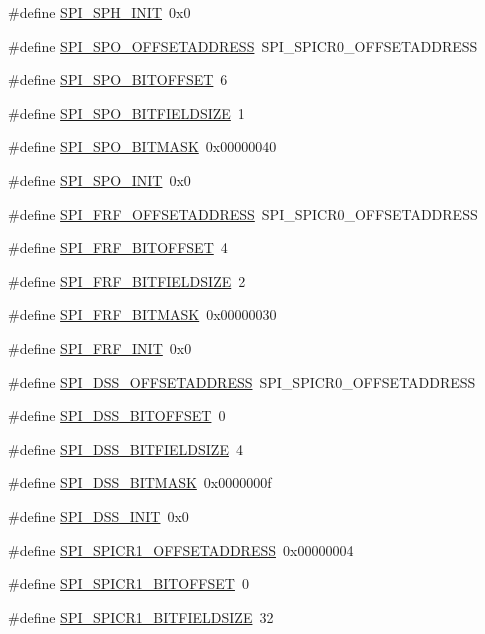 \begin{DoxyCompactItemize}
\#define \hyperlink{a00573_a8829e8547ceb20ef14e7c8264985f681}{SPI\_\-SPH\_\-INIT}~0x0
\item 
\#define \hyperlink{a00573_a82072330df5e7554bc2aa751a36dbbef}{SPI\_\-SPO\_\-OFFSETADDRESS}~SPI\_\-SPICR0\_\-OFFSETADDRESS
\item 
\#define \hyperlink{a00573_afad8700e3398535ed93efcd17d5f81d0}{SPI\_\-SPO\_\-BITOFFSET}~6
\item 
\#define \hyperlink{a00573_a732f4956a82bd56d8f26559dcef2acff}{SPI\_\-SPO\_\-BITFIELDSIZE}~1
\item 
\#define \hyperlink{a00573_a22d30b2da982bb491cee8354bc7ac302}{SPI\_\-SPO\_\-BITMASK}~0x00000040
\item 
\#define \hyperlink{a00573_ad2263aff8d70935c03305fd06c6724b4}{SPI\_\-SPO\_\-INIT}~0x0
\item 
\#define \hyperlink{a00573_a4cd3577861a0c1160cd3c207ad5e727e}{SPI\_\-FRF\_\-OFFSETADDRESS}~SPI\_\-SPICR0\_\-OFFSETADDRESS
\item 
\#define \hyperlink{a00573_abb932c58cfef04fc0a939d7c25624b70}{SPI\_\-FRF\_\-BITOFFSET}~4
\item 
\#define \hyperlink{a00573_ac58086f3e76986eb3e2edabf1bdd9dd4}{SPI\_\-FRF\_\-BITFIELDSIZE}~2
\item 
\#define \hyperlink{a00573_a92556c02dd2f6ae5c71b63c07acd3628}{SPI\_\-FRF\_\-BITMASK}~0x00000030
\item 
\#define \hyperlink{a00573_a4c9e5acb1fbb254d7bb8a00760edee09}{SPI\_\-FRF\_\-INIT}~0x0
\item 
\#define \hyperlink{a00573_ab5d56d9885baed2699e3cf00e670bfcc}{SPI\_\-DSS\_\-OFFSETADDRESS}~SPI\_\-SPICR0\_\-OFFSETADDRESS
\item 
\#define \hyperlink{a00573_a64161d7def53cf9e0b0e9e1a0d4ac089}{SPI\_\-DSS\_\-BITOFFSET}~0
\item 
\#define \hyperlink{a00573_a5f14106ac3875d61e073b11d46f8ba7e}{SPI\_\-DSS\_\-BITFIELDSIZE}~4
\item 
\#define \hyperlink{a00573_acc736a501ece37e3af089e36aef09e1a}{SPI\_\-DSS\_\-BITMASK}~0x0000000f
\item 
\#define \hyperlink{a00573_a0c0022af9d0104db02024619d436370b}{SPI\_\-DSS\_\-INIT}~0x0
\item 
\#define \hyperlink{a00573_a7c60d3ea4950f6026e1fa45d0541914e}{SPI\_\-SPICR1\_\-OFFSETADDRESS}~0x00000004
\item 
\#define \hyperlink{a00573_ab3ea9b0cfed75365cdd9580cf5b1a819}{SPI\_\-SPICR1\_\-BITOFFSET}~0
\item 
\#define \hyperlink{a00573_ab9bda7bb0b78bd515dbdc5f49e015210}{SPI\_\-SPICR1\_\-BITFIELDSIZE}~32

\end{DoxyCompactItemize}
